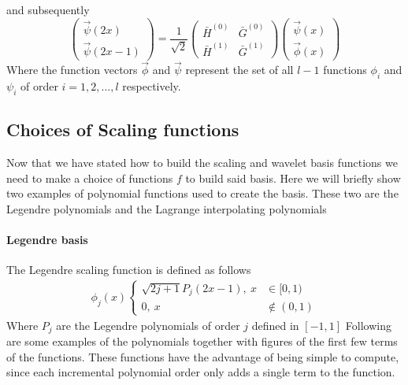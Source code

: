 \documentclass[../master_thesis.tex]{subfiles}
\begin{document}
and subsequently
\begin{equation}
  \begin{pmatrix}
    \vec{\psi}(2x) \\
    \vec{\psi}(2x-1)
  \end{pmatrix}
  = \frac{1}{\sqrt{2}}
  \begin{pmatrix}
    \bar{H}^{(0)} & \bar{G}^{(0)} \\
    \bar{H}^{(1)} & \bar{G}^{(1)}
  \end{pmatrix}
  \begin{pmatrix}
    \vec{\psi}(x) \\
    \vec{\phi}(x)
  \end{pmatrix}
\end{equation}
Where the function vectors $\vec{\phi}$ and $\vec{\psi}$ represent the set of
all $l-1$ functions $\phi_i$ and $\psi_i$ of order $i = 1, 2, ..., l$ respectively.

\subsection{Choices of Scaling functions }
Now that we have stated how to build the scaling and wavelet basis functions
we need to make a choice of functions $f$ to build said basis.
Here we will briefly show two examples of polynomial functions used to create the
basis. These two are the Legendre polynomials and the Lagrange interpolating
polynomials \cite{Beylkin:MRA, Beylkin1999AdaptiveSO}
\paragraph{Legendre basis}
The Legendre scaling function is defined as follows
\begin{align}
  \phi_j(x)
  \begin{cases}
    \sqrt{2j+1} P_j(2x-1), \ x&\in [0,1)\\
    0,\ x&\notin (0, 1)
  \end{cases}
\end{align}
Where $P_j$ are the Legendre polynomials of order $j$ defined in $[-1, 1]$ \cite{Beylkin:MRA}
Following are some examples of the polynomials together with figures of the first few terms
of the functions. These functions have the advantage of being simple to compute,
since each incremental polynomial order only adds a single term to the function.
\end{document}
